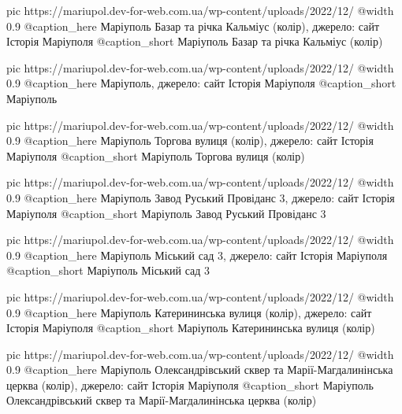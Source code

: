 	pic https://mariupol.dev-for-web.com.ua/wp-content/uploads/2022/12/%
	@width 0.9
	@caption_here Маріуполь Базар та річка Кальміус (колір), джерело: сайт Історія Маріуполя
	@caption_short Маріуполь Базар та річка Кальміус (колір)

	pic https://mariupol.dev-for-web.com.ua/wp-content/uploads/2022/12/%
	@width 0.9
	@caption_here Маріуполь, джерело: сайт Історія Маріуполя
	@caption_short Маріуполь

	pic https://mariupol.dev-for-web.com.ua/wp-content/uploads/2022/12/%
	@width 0.9
	@caption_here Маріуполь Торгова вулиця (колір), джерело: сайт Історія Маріуполя
	@caption_short Маріуполь Торгова вулиця (колір)

	pic https://mariupol.dev-for-web.com.ua/wp-content/uploads/2022/12/%
	@width 0.9
	@caption_here Маріуполь Завод Руський Провіданс 3, джерело: сайт Історія Маріуполя
	@caption_short Маріуполь Завод Руський Провіданс 3

	pic https://mariupol.dev-for-web.com.ua/wp-content/uploads/2022/12/%
	@width 0.9
	@caption_here Маріуполь Міський сад 3, джерело: сайт Історія Маріуполя
	@caption_short Маріуполь Міський сад 3

	pic https://mariupol.dev-for-web.com.ua/wp-content/uploads/2022/12/%
	@width 0.9
	@caption_here Маріуполь Катерининська вулиця (колір), джерело: сайт Історія Маріуполя
	@caption_short Маріуполь Катерининська вулиця (колір)

	pic https://mariupol.dev-for-web.com.ua/wp-content/uploads/2022/12/%
	@width 0.9
	@caption_here Маріуполь Олександрівський сквер та Марії-Магдалинінська церква (колір), джерело: сайт Історія Маріуполя
	@caption_short Маріуполь Олександрівський сквер та Марії-Магдалинінська церква (колір)

